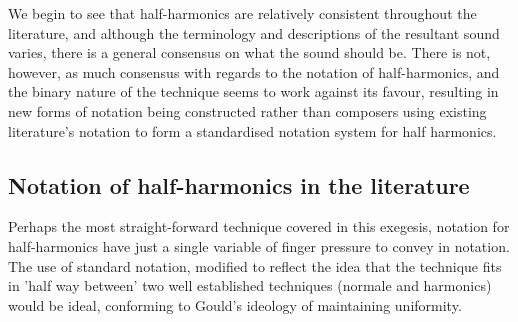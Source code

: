 We begin to see that half-harmonics are relatively consistent throughout the literature, and although the terminology and descriptions of the resultant sound varies, there is a general consensus on what the sound should be.
There is not, however, as much consensus with regards to the notation of half-harmonics, and the binary nature of the technique seems to work against its favour, resulting in new forms of notation being constructed rather than composers using existing literature's notation to form a standardised notation system for half harmonics.
\subsection{Notation of half-harmonics in the literature}
Perhaps the most straight-forward technique covered in this exegesis, notation for half-harmonics have just a single variable of finger pressure to convey in notation.
The use of standard notation, modified to reflect the idea that the technique fits in 'half way between' two well established techniques (normale and harmonics) would be ideal, conforming to Gould's ideology of maintaining uniformity.




